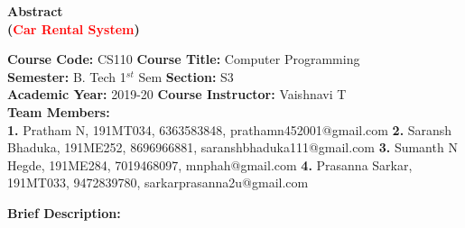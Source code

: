 \documentclass[12pt]{article}
\begin{document}


\begin{center}
    \textbf{\Large{Abstract \\
    (\textcolor{red}{Car Rental System})}}
\end{center}

\noindent 
\textbf{Course Code:} CS110 
\hspace{2in} 
\textbf{Course Title:} Computer Programming \\
\textbf{Semester:} B. Tech 1$^{st}$ Sem 
\hspace{1.6in} 
\textbf{Section:} S3 \\
\textbf{Academic Year:} 2019-20 
\hspace{1.8in} 
\textbf{Course Instructor:} Vaishnavi T \\
\textbf{Team Members:} \\
\textbf{1.} Pratham N, 191MT034, 6363583848, prathamn452001@gmail.com 
\newline
\textbf{2.} Saransh Bhaduka, 191ME252, 8696966881, saranshbhaduka111@gmail.com
\newline
\textbf{3.} Sumanth N Hegde, 191ME284, 7019468097, mnphah@gmail.com
\newline
\textbf{4.} Prasanna Sarkar, 191MT033, 9472839780, sarkarprasanna2u@gmail.com

\vspace{0.25in}

\noindent
\textbf{Brief Description:}
\newline
\end{document}
